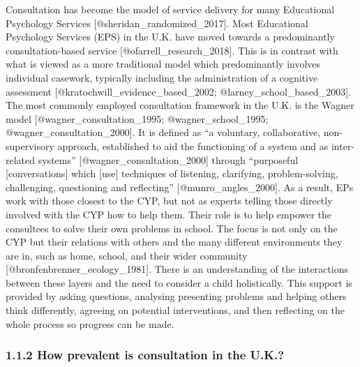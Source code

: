 \documentclass[
]{article}
\begin{document}
Consultation has become the model of service delivery for many
Educational Psychology Services {[}@sheridan\_randomized\_2017{]}. Most
Educational Psychology Services (EPS) in the U.K. have moved towards a
predominantly consultation-based service
{[}@ofarrell\_research\_2018{]}. This is in contrast with what is viewed
as a more traditional model which predominantly involves individual
casework, typically including the administration of a cognitive
assessment {[}@kratochwill\_evidence\_based\_2002;
@larney\_school\_based\_2003{]}. The most commonly employed consultation
framework in the U.K. is the Wagner model
{[}@wagner\_consultation\_1995; @wagner\_school\_1995;
@wagner\_consultation\_2000{]}. It is defined as ``a voluntary,
collaborative, non-supervisory approach, established to aid the
functioning of a system and as inter-related systems''
{[}@wagner\_consultation\_2000{]} through ``purposeful
{[}conversations{]} which {[}use{]} techniques of listening, clarifying,
problem-solving, challenging, questioning and reflecting''
{[}@munro\_angles\_2000{]}. As a result, EPs work with those closest to
the CYP, but not as experts telling those directly involved with the CYP
how to help them. Their role is to help empower the consultees to solve
their own problems in school. The focus is not only on the CYP but their
relations with others and the many different environments they are in,
such as home, school, and their wider community
{[}@bronfenbrenner\_ecology\_1981{]}. There is an understanding of the
interactions between these layers and the need to consider a child
holistically. This support is provided by asking questions, analysing
presenting problems and helping others think differently, agreeing on
potential interventions, and then reflecting on the whole process so
progress can be made.

\hypertarget{how-prevalent-is-consultation-in-the-u.k.}{%
\subsubsection{1.1.2 How prevalent is consultation in the
U.K.?}\label{how-prevalent-is-consultation-in-the-u.k.}}
\end{document}
